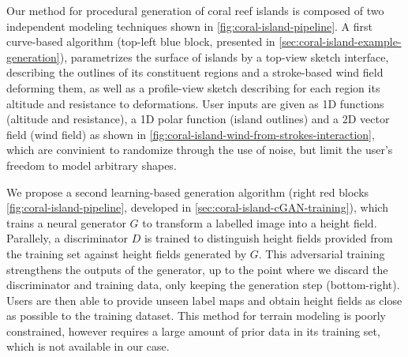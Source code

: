 




Our method for procedural generation of coral reef islands is composed of two independent modeling techniques shown in \cref{fig:coral-island-pipeline}. A first curve-based algorithm  (top-left blue block, presented in \cref{sec:coral-island-example-generation}), parametrizes the surface of islands by a top-view sketch interface, describing the outlines of its constituent regions and a stroke-based wind field deforming them, as well as a profile-view sketch describing for each region its altitude and resistance to deformations. User inputs are given as 1D functions (altitude and resistance), a 1D polar function (island outlines) and a 2D vector field (wind field) as shown in \cref{fig:coral-island-wind-from-strokes-interaction}, which are convinient to randomize through the use of noise, but limit the user's freedom to model arbitrary shapes.

We propose a second learning-based generation algorithm (right red blocks \cref{fig:coral-island-pipeline}, developed in \cref{sec:coral-island-cGAN-training}), which trains a neural generator $G$ to transform a labelled image into a height field. Parallely, a discriminator $D$ is trained to distinguish height fields provided from the training set against height fields generated by $G$. This adversarial training strengthens the outputs of the generator, up to the point where we discard the discriminator and training data, only keeping the generation step (bottom-right). Users are then able to provide unseen label maps and obtain height fields as close as possible to the training dataset. This method for terrain modeling is poorly constrained, however requires a large amount of prior data in its training set, which is not available in our case.

